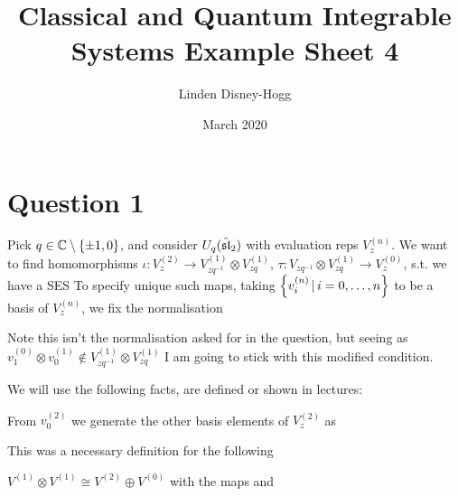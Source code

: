 \documentclass{article}
\title{Classical and Quantum Integrable Systems Example Sheet 4}
\author{Linden Disney-Hogg}
\date{March 2020}
\begin{document}
\maketitle
\tableofcontents

\section{Question 1}

Pick $q \in \mathbb{C}\setminus\left\{ \pm1, 0 \right\}$, and consider $U_q(\hat{\mathfrak{sl}}_2)$ with evaluation reps $V_z^{(n)}$. We want to find homomorphisms $\iota: V_z^{(2)} \to V_{zq^{-1}}^{(1)}\otimes V_{zq}^{(1)}$, $\tau : V_{zq^{-1}}\otimes V_{zq}^{(1)} \to V_z^{(0)}$, s.t. we have a SES
To specify unique such maps, taking $\left\{ v_i^{(n)} \, | \, i=0, \dots, n \right\}$ to be a basis of $V_z^{(n)}$, we fix the normalisation 

\begin{remark}
Note this isn't the normalisation asked for in the question, but seeing as $v_1^{(0)} \otimes v_0^{(1)} \notin V_{zq^{-1}}^{(1)}\otimes V_{zq}^{(1)}$ I am going to stick with this modified condition. 
\end{remark}
We will use the following facts, are defined or shown in lectures:

\begin{fact}
From $v_0^{(2)}$ we generate the other basis elements of $V_z^{(2)}$ as 
\end{fact}
This was a necessary definition for the following 
\begin{fact}
$V^{(1)} \otimes V^{(1)} \cong V^{(2)} \oplus V^{(0)}$ with the maps
and 
\end{fact}
\end{document}
